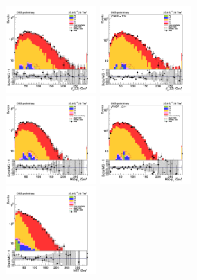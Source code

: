 \begin{figure}[tbp]
  \begin{center}
    \includegraphics[width=0.31\textwidth]{figures/mm_300_april18/mm_300_good_SR_bdt_sideBand_april18/hpt0_mm_SR_prefit_plot_apr18.png}
    \includegraphics[width=0.31\textwidth]{figures/mm_300_april18/mm_300_good_SR_bdt_sideBand_april18/hpt0_mm_SR_FullPostfit_plot_apr18.png}\\
    \includegraphics[width=0.31\textwidth]{figures/mm_300_april18/mm_300_good_SR_bdt_sideBand_april18/hpt1_mm_SR_prefit_plot_apr18.png}
    \includegraphics[width=0.31\textwidth]{figures/mm_300_april18/mm_300_good_SR_bdt_sideBand_april18/hpt1_mm_SR_FullPostfit_plot_apr18.png}\\
    \includegraphics[width=0.31\textwidth]{figures/mm_300_april18/mm_300_good_SR_bdt_sideBand_april18/met_pt_mm_SR_prefit_plot_apr18.png}

\end{center}
\end{figure}
